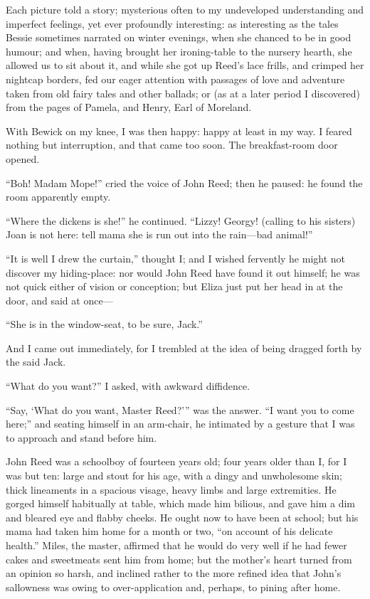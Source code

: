 Each picture told a story; mysterious often to my undeveloped
understanding and imperfect feelings, yet ever profoundly interesting:
as interesting as the tales Bessie sometimes narrated on winter
evenings, when she chanced to be in good humour; and when, having
brought her ironing-table to the nursery hearth, she allowed us to sit
about it, and while she got up \Mrs{} Reed's lace frills, and crimped her
nightcap borders, fed our eager attention with passages of love and
adventure taken from old fairy tales and other ballads; or (as at a
later period I discovered) from the pages of Pamela, and Henry, Earl of
Moreland.

With Bewick on my knee, I was then happy: happy at least in my way. I
feared nothing but interruption, and that came too soon. The
breakfast-room door opened.

\enquote{Boh! Madam Mope!} cried the voice of John Reed; then he
paused: he found the room apparently empty.

\enquote{Where the dickens is she!} he continued. \enquote{Lizzy! 
Georgy! (calling to his sisters) Joan is not here: tell mama she is run
out into the rain---bad animal!}

\enquote{It is well I drew the curtain,} thought I; and I wished
fervently he might not discover my hiding-place: nor would John Reed
have found it out himself; he was not quick either of vision or
conception; but Eliza just put her head in at the door, and said at
once---

\enquote{She is in the window-seat, to be sure, Jack.}

And I came out immediately, for I trembled at the idea of being dragged
forth by the said Jack.

\enquote{What do you want?} I asked, with awkward diffidence.

\enquote{Say, \enquote{What do you want, Master Reed?}} was the
answer. \enquote{I want you to come here;} and seating himself in an
arm-chair, he intimated by a gesture that I was to approach and stand
before him.

John Reed was a schoolboy of fourteen years old; four years older than
I, for I was but ten: large and stout for his age, with a dingy and
unwholesome skin; thick lineaments in a spacious visage, heavy limbs and
large extremities. He gorged himself habitually at table, which made
him bilious, and gave him a dim and bleared eye and flabby cheeks. He
ought now to have been at school; but his mama had taken him home for a
month or two, \enquote{on account of his delicate health.} \Mr{} Miles,
the master, affirmed that he would do very well if he had fewer cakes
and sweetmeats sent him from home; but the mother's heart turned from an
opinion so harsh, and inclined rather to the more refined idea that
John's sallowness was owing to over-application and, perhaps, to pining
after home.

